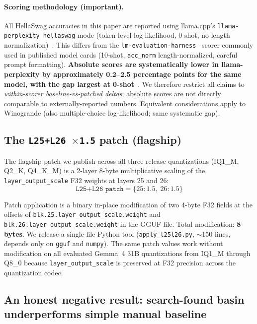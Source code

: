 \documentclass[11pt]{article}
\begin{document}
\paragraph{Scoring methodology (important).}
All HellaSwag accuracies in this paper are reported using llama.cpp's
\texttt{llama-perplexity \-\-hellaswag} mode (token-level log-likelihood,
0-shot, no length normalization)~\cite{llamacpp,llamacpp_hellaswag_disc}. This
differs from the \texttt{lm-evaluation-harness}~\cite{lmevalharness}
scorer commonly used in published model cards (10-shot, \texttt{acc\_norm}
length-normalized, careful prompt formatting). \textbf{Absolute scores are
systematically lower in llama-perplexity by approximately 0.2--2.5 percentage
points for the same model, with the gap largest at 0-shot}~\cite{llamacpp_hellaswag_disc}.
We therefore restrict all claims to \emph{within-scorer baseline-vs-patched
deltas}; absolute scores are not directly comparable to externally-reported
numbers. Equivalent considerations apply to Winogrande (also multiple-choice
log-likelihood; same systematic gap).

\subsection{The \texttt{L25{+}L26 $\times$1.5} patch (flagship)}
\label{ssec:basinb}

The flagship patch we publish across all three release quantizations
(IQ1\_M, Q2\_K, Q4\_K\_M) is a 2-layer 8-byte multiplicative scaling of
the \texttt{layer\_output\_scale} F32 weights at layers 25 and 26:
\begin{equation*}
\texttt{L25+L26 patch} = \{25:1.5,\;26:1.5\}
\end{equation*}

Patch application is a binary in-place modification of two 4-byte F32 fields
at the offsets of \texttt{blk.25.layer\_output\_scale.weight} and
\texttt{blk.26.layer\_output\_scale.weight} in the GGUF file. Total
modification: \textbf{8 bytes}. We release a single-file Python tool
(\texttt{apply\_l25l26.py}, $\sim$150 lines, depends only on \texttt{gguf}
and \texttt{numpy}). The same patch values work without modification on
all evaluated Gemma~4 31B quantizations from IQ1\_M through Q8\_0 because
\texttt{layer\_output\_scale} is preserved at F32 precision across the
quantization codec.

\subsection{An honest negative result: search-found basin underperforms simple manual baseline}
\label{ssec:basinb_compare}
\end{document}
